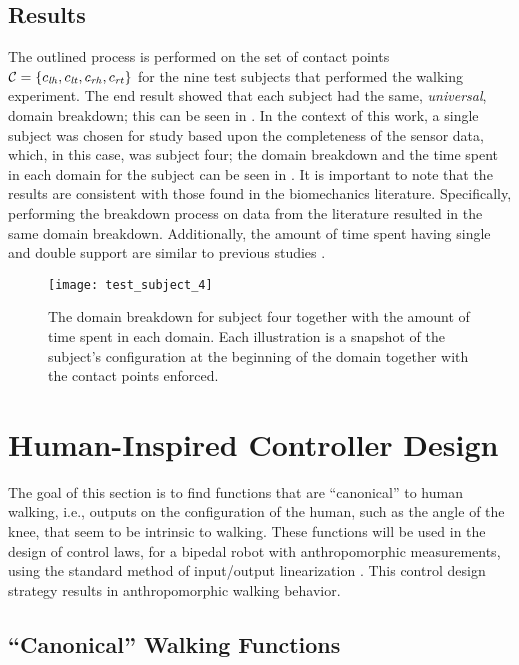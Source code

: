 \subsection{Results} The outlined process is performed on the set of contact
points $\mathcal{C} =  \{c_{\mathit{lh}}, c_{\mathit{lt}}, c_{\mathit{rh}} , c_{\mathit{rt}}\}$ for the nine test subjects that
performed the walking experiment. The end result showed that each subject had
the same, {\em universal}, domain breakdown; this can be seen in
. In the context of this work, a single subject was
chosen for study based upon the completeness of the sensor data, which, in this
case, was subject four; the domain breakdown and the time spent in each domain
for the subject can be seen in . It is important to note that the
results are consistent with those found in the biomechanics
literature. Specifically, performing the breakdown process on data from the
literature \cite{Winter2009} resulted in the same domain breakdown. Additionally,
the amount of time spent having single and double support are similar to
previous studies \cite{Ackermann2007}.

\begin{figure}[t]
  \centering
  \texttt{[image: test\_subject\_4]}
  \caption[The domain breakdown for subject four]{The domain breakdown for subject four together with the amount of time spent in each domain. Each illustration is a snapshot of the subject's configuration at the beginning of the domain together with the contact points enforced.}
  \label{fred}
\end{figure}

\section{Human-Inspired Controller Design}

The goal of this section is to find functions that are ``canonical'' to human
walking, i.e., outputs on the configuration of the human, such as the angle of
the knee, that seem to be intrinsic to walking. These functions will be used in
the design of control laws, for a bipedal robot with anthropomorphic
measurements, using the standard method of input/output linearization
\cite{Sastry1999}. This control design strategy results in anthropomorphic
walking behavior.

\subsection{``Canonical'' Walking Functions} \label{sec:functions}

